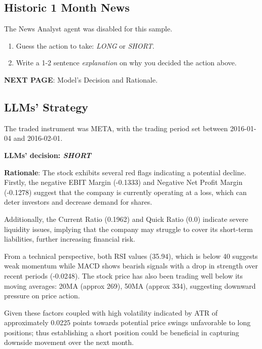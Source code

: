\documentclass[8pt]{scrartcl}
\begin{document}
\subsection*{Historic 1 Month News}

The News Analyst agent was disabled for this sample.

\begin{tcolorbox}[colback=blue!10, colframe=blue!60, title=\textbf{TASKS}, sharp corners=southwest]
\begin{enumerate}
    \item Guess the action to take: \textit{LONG} or \textit{SHORT}.
    \item Write a 1-2 sentence \textit{explanation} on why you decided the action above.
\end{enumerate}
\end{tcolorbox}
\textbf{NEXT PAGE}: Model's Decision and Rationale.

\newpage

\subsection*{LLMs' Strategy} \label{strategy10}

The traded instrument was META, with the trading period set between 2016-01-04 and 2016-02-01.

\textbf{LLMs' decision: \textit{SHORT}}

\textbf{Rationale}: The stock exhibits several red flags indicating a potential decline. Firstly, the negative EBIT Margin (-0.1333) and Negative Net Profit Margin (-0.1278) suggest that the company is currently operating at a loss, which can deter investors and decrease demand for shares.

Additionally, the Current Ratio (0.1962) and Quick Ratio (0.0) indicate severe liquidity issues, implying that the company may struggle to cover its short-term liabilities, further increasing financial risk.

From a technical perspective, both RSI values (35.94), which is below 40 suggests weak momentum while MACD shows bearish signals with a drop in strength over recent periods (-0.0248). The stock price has also been trading well below its moving averages: 20MA (approx 269), 50MA (approx 334), suggesting downward pressure on price action.

Given these factors coupled with high volatility indicated by ATR of approximately 0.0225 points towards potential price swings unfavorable to long positions; thus establishing a short position could be beneficial in capturing downside movement over the next month.
\end{document}
